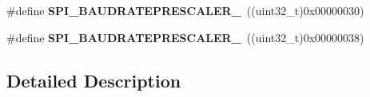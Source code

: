 \begin{DoxyCompactItemize}
\item 
\#define {\bfseries S\+P\+I\+\_\+\+B\+A\+U\+D\+R\+A\+T\+E\+P\+R\+E\+S\+C\+A\+L\+E\+R\+\_}~((uint32\+\_\+t)0x00000030)\hypertarget{group___s_p_i___baud_rate___prescaler_ga939117a1ff97fbf4f1340cbb3141fb29}{}\label{group___s_p_i___baud_rate___prescaler_ga939117a1ff97fbf4f1340cbb3141fb29}

\item 
\#define {\bfseries S\+P\+I\+\_\+\+B\+A\+U\+D\+R\+A\+T\+E\+P\+R\+E\+S\+C\+A\+L\+E\+R\+\_}~((uint32\+\_\+t)0x00000038)\hypertarget{group___s_p_i___baud_rate___prescaler_ga4debd0953aeeb470eae28a42aa8289c2}{}\label{group___s_p_i___baud_rate___prescaler_ga4debd0953aeeb470eae28a42aa8289c2}

\end{DoxyCompactItemize}


\subsection{Detailed Description}
